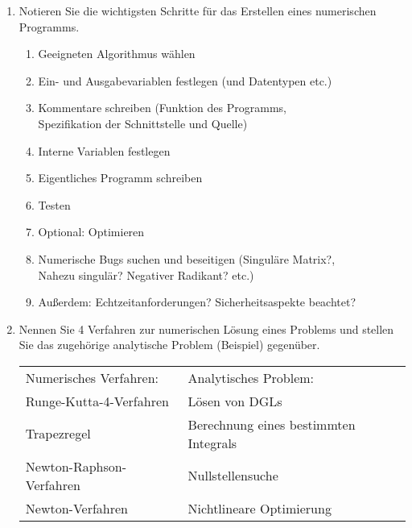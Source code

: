 \documentclass[12pt]{article}
\begin{document}
\begin{enumerate}
	\item Notieren Sie die wichtigsten Schritte für das Erstellen eines numerischen Programms.
	
	\begin{solution}
	\begin{enumerate}[label=$(\roman*)$]
		\item Geeigneten Algorithmus wählen
		\item Ein- und Ausgabevariablen festlegen (und Datentypen etc.)
		\item Kommentare schreiben (Funktion des Programms, \\Spezifikation der Schnittstelle und Quelle)
		\item Interne Variablen festlegen
		\item Eigentliches Programm schreiben
		\item Testen
		\item Optional: Optimieren
		\item Numerische Bugs suchen und beseitigen (Singuläre Matrix?,\\ Nahezu singulär? Negativer Radikant? etc.)
		\item Außerdem: Echtzeitanforderungen? Sicherheitsaspekte beachtet?
	\end{enumerate}
	\end{solution}
	\vspace{2cm}
	
	\item Nennen Sie 4 Verfahren zur numerischen Lösung eines Problems und stellen Sie das zugehörige analytische Problem (Beispiel) gegenüber.

	\begin{solution}
	\begin{tabular}{l|l}
		Numerisches Verfahren: & Analytisches Problem:\\
		Runge-Kutta-4-Verfahren & Lösen von DGLs \\
		Trapezregel	& Berechnung eines bestimmten Integrals \\
		Newton-Raphson-Verfahren & Nullstellensuche \\
		Newton-Verfahren & Nichtlineare Optimierung
	\end{tabular}
	\end{solution}
\end{enumerate}

\pagebreak
\newcommand{\zeilensummennorm}[1]{||#1||_{\infty}}
\end{document}
